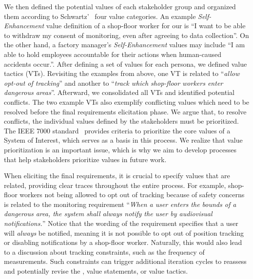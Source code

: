 We then defined the potential values of each stakeholder group and organized them according to  Schwartz'~\cite{schwartz1992Universals} four value categories. %
An example \textit{Self-Enhancement} value definition of a shop-floor worker for our \muc is ``I want to be able to withdraw my consent of monitoring, even after agreeing to data collection''.
On the other hand, a factory manager's \textit{Self-Enhancement} values may include ``I am able to hold employees accountable for their actions when human-caused accidents occur.''. After defining a set of values for each persona, we defined value tactics (VTs). 
Revisiting the examples from above, one VT is related to \enquote{\textit{allow opt-out of tracking}} and another to \enquote{\textit{track which shop-floor workers enter dangerous areas}}.
Afterward, we consolidated all VTs and identified potential conflicts. 
The two example VTs also exemplify conflicting values which need to be resolved before the final requirements elicitation phase. We argue that, to resolve conflicts, the individual values defined by the stakeholders must be prioritized. The IEEE 7000\textsuperscript{\texttrademark} standard~\cite{noauthor2021ieee} provides criteria to prioritize the core values of a System of Interest, which serves as a basis in this process. 
We realize that value prioritization is an important issue, which is why we aim to develop processes that help stakeholders prioritize values in future work.

When eliciting the final requirements, it is crucial to specify values that are related, providing clear traces throughout the entire process.
For example, shop-floor workers not being allowed to opt out of tracking because of safety concerns is related to the   monitoring requirement  \enquote{\textit{When a user enters the bounds of a dangerous area, the system shall always notify the user by audiovisual notifications.}} %
Notice that the wording of the requirement specifies that a user will \textit{always} be notified, meaning it is not possible to opt out of position tracking or disabling notifications by a shop-floor worker. 
Naturally, this would also lead to a discussion about tracking constraints, such as the frequency of measurements.
Such constraints can trigger additional iteration cycles to reassess and potentially revise the \muc, value statements, or value tactics. 


